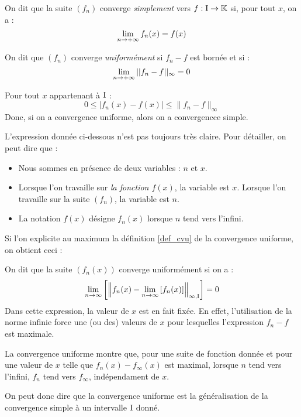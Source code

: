 \begin{defi}
On dit que la suite $(f_n)$ converge \emph{simplement} vers $f:\text{I}\to\mathbb{K}$ si, pour tout $x$, on a :
$$\lim\limits_{n\to+\infty}f_n(x)=f(x)$$
\end{defi}

\begin{defi}\label{def_cvu}
On dit que $(f_n)$ converge \emph{uniformément} si $f_n-f$ est bornée et si :
$$\lim\limits_{n\to+\infty}||f_n-f||_\infty = 0$$
\end{defi}

\begin{rem}
Pour tout $x$ appartenant à $\text{I}$ :
$$0\leq |f_n(x)-f(x)|\leq \|f_n-f\|_\infty$$
Donc, si on a convergence uniforme, alors on a convergencce simple.
\end{rem}

\begin{note}
L'expression donnée ci-dessous n'est pas toujours très claire. Pour détailler, on peut dire que :
\begin{itemize}
	\item Nous sommes en présence de deux variables : $n$ et $x$.
    \item Lorsque l'on travaille sur \emph{la fonction $f(x)$}, la variable est $x$. Lorsque l'on travaille sur la suite $(f_n)$, la variable est $n$.
    \item La notation $f(x)$ désigne $f_n(x)$ lorsque $n$ tend vers l'infini.
\end{itemize}
Si l'on explicite au maximum la définition \ref{def_cvu} de la convergence uniforme, on obtient ceci :

On dit que la suite $(f_n(x))$ converge uniformément si on a :
$$\lim\limits_{n\to\infty}\left[\left\|f_n(x) - \lim\limits_{n\to\infty}\left[f_n(x)\right] \right\|_{\infty,\text{I}} \right]=0$$
Dans cette expression, la valeur de $x$ est en fait fixée. En effet, l'utilisation de la norme infinie force une (ou des) valeurs de $x$ pour lesquelles l'expression $f_n-f$ est maximale. 

La convergence uniforme montre que, pour une suite de fonction donnée et pour une valeur de $x$ telle que $f_n(x) - f_\infty(x)$ est maximal, lorsque $n$ tend vers l'infini, $f_n$ tend vers $f_\infty$, indépendament de $x$.

On peut donc dire que la convergence uniforme est la généralisation de la convergence simple à un intervalle $\text{I}$ donné.
\end{note}

